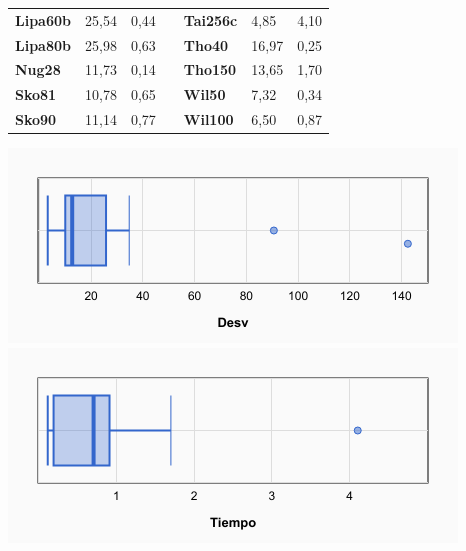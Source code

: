 \documentclass[a4paper, 12pt]{article}
\begin{document}
\begin{table}[H]
\begin{tabular}{|l|l|l|l|l|l|l|}
\textbf{Lipa60b}                    & 25,54                              & 0,44                                 &                                & \textbf{Tai256c}                   & 4,85                               & 4,10                                 \\ \cline{1-3} \cline{5-7} 
\textbf{Lipa80b}                    & 25,98                              & 0,63                                 &                                & \textbf{Tho40}                     & 16,97                              & 0,25                                 \\ \cline{1-3} \cline{5-7} 
\textbf{Nug28}                      & 11,73                              & 0,14                                 &                                & \textbf{Tho150}                    & 13,65                              & 1,70                                 \\ \cline{1-3} \cline{5-7} 
\textbf{Sko81}                      & 10,78                              & 0,65                                 &                                & \textbf{Wil50}                     & 7,32                               & 0,34                                 \\ \cline{1-3} \cline{5-7} 
\textbf{Sko90}                      & 11,14                              & 0,77                                 &                                & \textbf{Wil100}                    & 6,50                               & 0,87                                 \\ \cline{1-3} \cline{5-7} 
\end{tabular}
\end{table}

	\begin{center}
         \includegraphics[scale=0.42]{boxplot-aggox-desv}
         \includegraphics[scale=0.42]{boxplot-aggox-time}
      \end{center}
      
\end{document}
